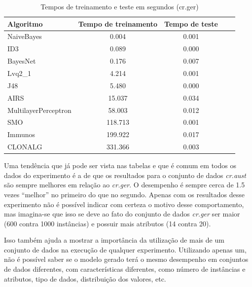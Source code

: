 \begin{table}[h!]
    \vspace{0.5cm}
    \centering
    \caption{Tempos de treinamento e teste em segundos (cr.ger)}
    \label{tbl:dev_table_ger_times}
    \label{tbl:dev_table_last}
    \vspace{0.5cm}
    \begin{tabular}{|l|c|c|c|c|}
        \hline
        \textbf{Algoritmo} & \textbf{Tempo de treinamento} & \textbf{Tempo de teste} \\
        \hline
        \rowcolor[gray]{.9}
        NaiveBayes           &   0.004 & 0.001 \\ \hline
        \rowcolor[gray]{.9}
        ID3                  &   0.089 & 0.000 \\ \hline
        \rowcolor[gray]{.9}
        BayesNet             &   0.176 & 0.007 \\ \hline
        Lvq2\_1              &   4.214 & 0.001 \\ \hline
        J48                  &   5.480 & 0.000 \\ \hline
        AIRS                 &  15.037 & 0.034 \\ \hline
        MultilayerPerceptron &  58.003 & 0.012 \\ \hline
        SMO                  & 118.713 & 0.001 \\ \hline
        Immunos              & 199.922 & 0.017 \\ \hline
        CLONALG              & 331.366 & 0.003 \\ \hline
    \end{tabular}
    \vspace{0.5cm}
\end{table}

Uma tendência que já pode ser vista nas tabelas e que é comum em todos os dados do experimento é a de que os resultados para o conjunto de dados \emph{cr.aust} são sempre melhores em relação ao \emph{cr.ger}. O desempenho é sempre cerca de 1.5 vezes ``melhor'' no primeiro do que no segundo. Apenas com os resultados desse experimento não é possível indicar com certeza o motivo desse comportamento, mas imagina-se que isso se deve ao fato do conjunto de dados \emph{cr.ger} ser maior (600 contra 1000 instâncias) e possuir mais atributos (14 contra 20).

Isso também ajuda a mostrar a importância da utilização de mais de um conjunto de dados na execução de qualquer experimento. Utilizando apenas um, não é possível saber se o modelo gerado terá o mesmo desempenho em conjuntos de dados diferentes, com características diferentes, como número de instâncias e atributos, tipo de dados, distribuição dos valores, etc.

